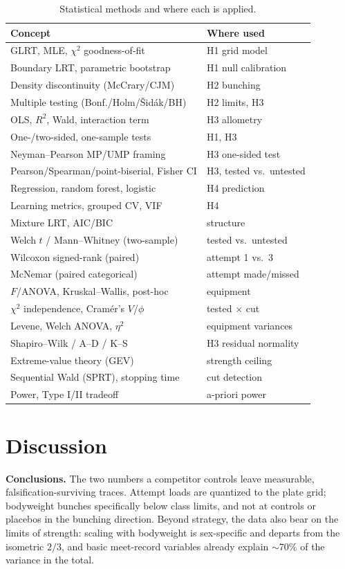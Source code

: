 \documentclass[conference]{IEEEtran}
\begin{document}
\begin{table}[t]\centering
\caption{Statistical methods and where each is applied.}
\label{tab:tools}
\begin{tabular}{ll}
\toprule
Concept & Where used\\
\midrule
GLRT, MLE, $\chi^2$ goodness-of-fit & H1 grid model\\
Boundary LRT, parametric bootstrap & H1 null calibration\\
Density discontinuity (McCrary/CJM) & H2 bunching\\
Multiple testing (Bonf./Holm/\v{S}id\'ak/BH) & H2 limits, H3\\
OLS, $R^2$, Wald, interaction term & H3 allometry\\
One-/two-sided, one-sample tests & H1, H3\\
Neyman--Pearson MP/UMP framing & H3 one-sided test\\
Pearson/Spearman/point-biserial, Fisher CI & H3, tested vs.\ untested\\
Regression, random forest, logistic & H4 prediction\\
Learning metrics, grouped CV, VIF & H4\\
Mixture LRT, AIC/BIC & structure\\
Welch $t$ / Mann--Whitney (two-sample) & tested vs.\ untested\\
Wilcoxon signed-rank (paired) & attempt 1 vs.\ 3\\
McNemar (paired categorical) & attempt made/missed\\
$F$/ANOVA, Kruskal--Wallis, post-hoc & equipment\\
$\chi^2$ independence, Cram\'er's $V$/$\phi$ & tested $\times$ cut\\
Levene, Welch ANOVA, $\eta^2$ & equipment variances\\
Shapiro--Wilk / A--D / K--S & H3 residual normality\\
Extreme-value theory (GEV) & strength ceiling\\
Sequential Wald (SPRT), stopping time & cut detection\\
Power, Type I/II tradeoff & a-priori power\\
\bottomrule
\end{tabular}
\end{table}

\section{Discussion}
\textbf{Conclusions.} The two numbers a competitor controls leave measurable,
falsification-surviving traces. Attempt loads are quantized to the plate grid;
bodyweight bunches specifically below class limits, and not at controls or placebos
in the bunching direction. Beyond strategy, the data also bear on the limits of
strength: scaling with bodyweight is sex-specific and departs from the isometric
$2/3$, and basic meet-record variables already explain $\sim$70\% of the variance
in the total.
\end{document}
